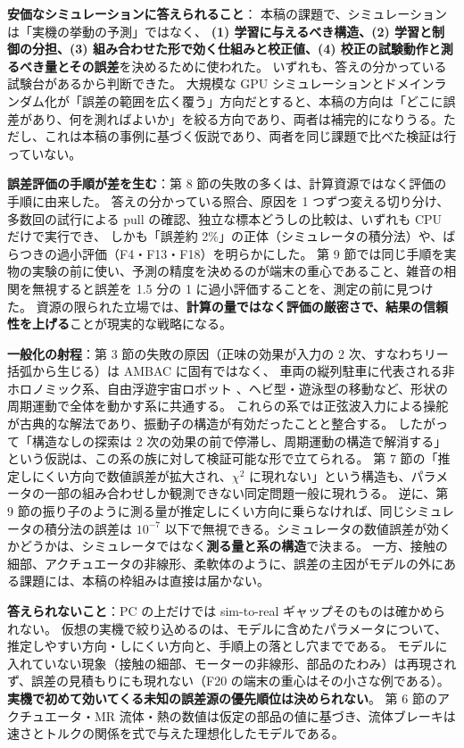 \documentclass[paper=a4paper,fontsize=10pt,twocolumn,column_gap=2zw,line_length=24zw,number_of_lines=46,head_space=20mm]{jlreq}
\begin{document}
\textbf{安価なシミュレーションに答えられること}：
本稿の課題で、シミュレーションは「実機の挙動の予測」ではなく、
\textbf{(1) 学習に与えるべき構造、(2) 学習と制御の分担、(3) 組み合わせた形で効く仕組みと校正値、(4) 校正の試験動作と測るべき量とその誤差}を決めるために使われた。
いずれも、答えの分かっている試験台があるから判断できた。
大規模な GPU シミュレーションとドメインランダム化が「誤差の範囲を広く覆う」方向だとすると、本稿の方向は「どこに誤差があり、何を測ればよいか」を絞る方向であり、両者は補完的になりうる。ただし、これは本稿の事例に基づく仮説であり、両者を同じ課題で比べた検証は行っていない。

\textbf{誤差評価の手順が差を生む}：第 8 節の失敗の多くは、計算資源ではなく評価の手順に由来した。
答えの分かっている照合、原因を 1 つずつ変える切り分け、多数回の試行による pull の確認、独立な標本どうしの比較は、いずれも CPU だけで実行でき、
しかも「誤差約 2\%」の正体（シミュレータの積分法）や、ばらつきの過小評価（F4・F13・F18）を明らかにした。
第 9 節では同じ手順を実物の実験の前に使い、予測の精度を決めるのが端末の重心であること、雑音の相関を無視すると誤差を 1.5 分の 1 に過小評価することを、測定の前に見つけた。
資源の限られた立場では、\textbf{計算の量ではなく評価の厳密さで、結果の信頼性を上げる}ことが現実的な戦略になる。

\textbf{一般化の射程}：第 3 節の失敗の原因（正味の効果が入力の 2 次、すなわちリー括弧から生じる）は AMBAC に固有ではなく、
車両の縦列駐車に代表される非ホロノミック系、自由浮遊宇宙ロボット \cite{nakamura1991}、ヘビ型・遊泳型の移動など、形状の周期運動で全体を動かす系に共通する。
これらの系では正弦波入力による操舵 \cite{murray1993} が古典的な解法であり、振動子の構造が有効だったことと整合する。
したがって「構造なしの探索は 2 次の効果の前で停滞し、周期運動の構造で解消する」という仮説は、この系の族に対して検証可能な形で立てられる。
第 7 節の「推定しにくい方向で数値誤差が拡大され、$\chi^2$ に現れない」という構造も、パラメータの一部の組み合わせしか観測できない同定問題一般に現れうる。
逆に、第 9 節の振り子のように測る量が推定しにくい方向に乗らなければ、同じシミュレータの積分法の誤差は $10^{-7}$ 以下で無視できる。シミュレータの数値誤差が効くかどうかは、シミュレータではなく\textbf{測る量と系の構造}で決まる。
一方、接触の細部、アクチュエータの非線形、柔軟体のように、誤差の主因がモデルの外にある課題には、本稿の枠組みは直接は届かない。

\textbf{答えられないこと}：PC の上だけでは sim-to-real ギャップそのものは確かめられない。
仮想の実機で絞り込めるのは、モデルに含めたパラメータについて、推定しやすい方向・しにくい方向と、手順上の落とし穴までである。
モデルに入れていない現象（接触の細部、モーターの非線形、部品のたわみ）は再現されず、誤差の見積もりにも現れない（F20 の端末の重心はその小さな例である）。\textbf{実機で初めて効いてくる未知の誤差源の優先順位は決められない}。
第 6 節のアクチュエータ・MR 流体・熱の数値は仮定の部品の値に基づき、流体ブレーキは速さとトルクの関係を式で与えた理想化したモデルである。
\end{document}
